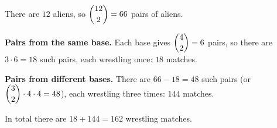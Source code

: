 There are $12$ aliens, so $\dbinom{12}{2}=66$ pairs of aliens.

\textbf{Pairs from the same base.} Each base gives $\dbinom42=6$ pairs, so there are $3\cdot6=18$ such pairs, each wrestling once: $18$ matches.

\textbf{Pairs from different bases.} There are $66-18=48$ such pairs (or $\dbinom32\cdot4\cdot4=48$), each wrestling three times: $144$ matches.

In total there are $18+144=\boxed{162}$ wrestling matches.
